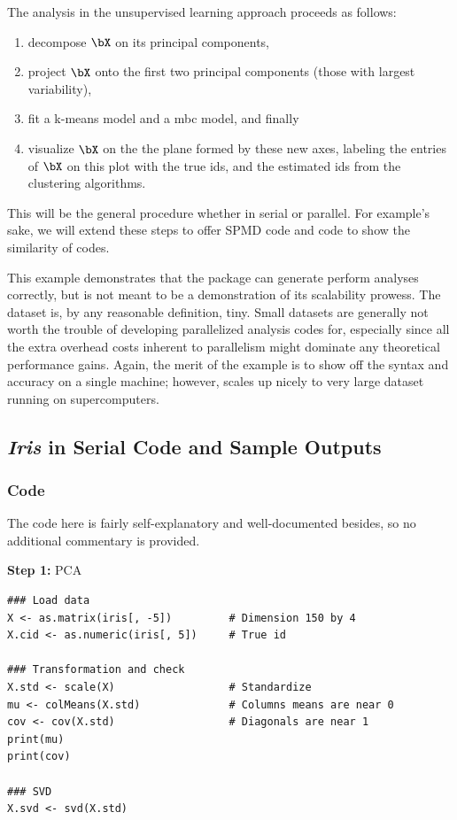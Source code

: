 The analysis in the unsupervised learning approach proceeds as follows:
\begin{enumerate}
\item decompose $\bX$ on its principal components,
\item project $\bX$ onto the first two principal components (those with largest variability),
\item fit a k-means model and a mbc model, and finally
\item visualize $\bX$ on the the plane formed by these new axes, labeling the entries of $\bX$ on this plot with the true ids, and the estimated ids from the clustering algorithms.
\end{enumerate}
This will be the general procedure whether in serial or parallel.  For example's sake, we will extend these steps 
to offer SPMD code and  code to show the similarity of codes.

This example demonstrates that the  package can generate perform analyses correctly, but is not
meant to be a demonstration of its scalability prowess.  The  dataset is, by any reasonable definition, tiny.  Small datasets are generally not worth the trouble of developing parallelized analysis codes for, especially since all the extra overhead costs inherent to parallelism might dominate any theoretical performance gains.  Again, the merit of the example is to show off the syntax and accuracy on a single machine; however,  scales up nicely to very large dataset running on supercomputers.



\subsection{{\it Iris} in Serial Code and Sample Outputs}

\subsubsection{Code}
The code here is fairly self-explanatory and well-documented besides, so no additional commentary is provided.

\textbf{Step 1:}  PCA\vspace{-.6cm}
\begin{lstlisting}[language=rr]
### Load data
X <- as.matrix(iris[, -5])         # Dimension 150 by 4
X.cid <- as.numeric(iris[, 5])     # True id

### Transformation and check
X.std <- scale(X)                  # Standardize
mu <- colMeans(X.std)              # Columns means are near 0
cov <- cov(X.std)                  # Diagonals are near 1
print(mu)
print(cov)

### SVD
X.svd <- svd(X.std)
\end{lstlisting}


